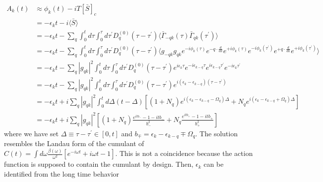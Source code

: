 \begin{align}
    A_k(t) &\approx \phi_k(t) - i T[\bar{S}]_c \\
&= -\epsilon_k t - i \langle \bar{S} \rangle \\
&= -\epsilon_k t - \sum_q \int_0^t d \tau \int_0^\tau d \tau^{\prime} D_q^{(0)}\left(\tau-\tau^{\prime}\right) \langle \bar{\Gamma}_{-q k}(\tau) \bar{\Gamma}_{q k}\left(\tau^{\prime}\right) \rangle  \\
&= -\epsilon_k t - \sum_q \int_0^t d \tau \int_0^\tau d \tau^{\prime} D_q^{(0)}\left(\tau-\tau^{\prime}\right) \langle g_{-q k} g_{q k} e^{-i \phi_k(\tau)} e^{-q \cdot \frac{d}{d k}} e^{+i \phi_k(\tau)} e^{-i \phi_k\left(\tau^{\prime}\right)} e^{+q \cdot \frac{d}{d k}} e^{+i \phi_k\left(\tau^{\prime}\right)} \rangle \\
&= -\epsilon_k t - \sum_q |g_{qk}|^2 \int_0^t d \tau \int_0^\tau d \tau^{\prime} D_q^{(0)}\left(\tau-\tau^{\prime}\right) e^{i \epsilon_k \tau} e^{-i \epsilon_{k-q} \tau} e^{i \epsilon_{k-q} \tau^{\prime}} e^{-i \epsilon_k \tau^{\prime}}  \\
&= -\epsilon_k t - \sum_q |g_{qk}|^2 \int_0^t d \tau \int_0^\tau d \tau^{\prime} D_q^{(0)}\left(\tau-\tau^{\prime}\right) e^{i\left(\epsilon_k-\epsilon_{k-q}\right)\left(\tau-\tau^{\prime}\right)} \\
&= -\epsilon_k t + i \sum_q |g_{qk}|^2 \int_0^t d \Delta (t - \Delta) \left[ \left(1 + N_q \right) e^{i\left(\epsilon_k - \epsilon_{k - q} - \Omega_q\right) \Delta} + N_q e^{i\left(\epsilon_k - \epsilon_{k - q} + \Omega_q\right) \Delta} \right] \\
&= -\epsilon_k t + i \sum_q |g_{qk}|^2 \left[ \left(1 + N_q \right) \frac{e^{i t b_{-}} - 1 - i t b_{-}}{b_{-}^2} + N_q \frac{e^{i t b_{+}} - 1 - i t b_{+}}{b_{+}^2} \right]
\end{align}
where we have set $\Delta \equiv \tau - \tau^{\prime} \in [0, t]$ and $b_{\mp} = \epsilon_k - \epsilon_{k - q} \mp \Omega_q$. The solution resembles the Landau form of the cumulant of $C(t)=\int d \omega \frac{\beta(\omega)}{\omega^2}\left[e^{-i \omega t}+i \omega t-1\right]$. This is not a coincidence because the action function is supposed to contain the cumulant by design. Then, $\epsilon_k$ can be identified from the long time behavior
